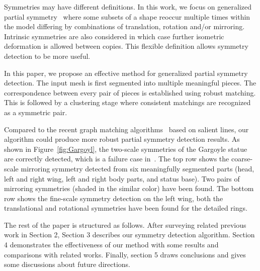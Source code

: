Symmetries may have different definitions. In this work, we focus on generalized partial symmetry~\cite{mitra2006,berner2011} where some subsets of a shape reoccur multiple times within the model differing by combinations of translation, rotation and/or mirroring. Intrinsic symmetries are also considered in which case further isometric deformation is allowed between copies. This flexible definition allows symmetry detection to be more useful.

In this paper, we propose an effective method for generalized partial symmetry detection.
The input mesh is first segmented into multiple meaningful pieces. The correspondence between every pair of pieces
is established using robust matching.
This is followed by a clustering stage where consistent matchings are recognized as a symmetric pair.

Compared to the recent graph matching algorithms~\cite{bokeloh2009,berner2011} based on salient lines, our algorithm could produce more robust partial symmetry detection results.
As shown in Figure~\ref{fig:Gargoyl}, the two-scale symmetries of the Gargoyle statue are correctly detected, which is a failure case in~\cite{berner2011}.
The top row shows the coarse-scale mirroring symmetry detected from six meaningfully segmented parts (head, left and right wing, left and right body parts, and status base). 
Two pairs of mirroring symmetries (shaded in the similar color) have been found.
The bottom row shows the fine-scale symmetry detection on the left wing, both the translational and rotational symmetries have been found for the detailed rings.

The rest of the paper is structured as follows. After surveying related previous work in Section 2, Section 3 describes our symmetry detection algorithm.
Section 4 demonstrates the effectiveness of our method with some results and comparisons with related works. Finally, section 5 draws conclusions and gives some discussions about future directions. 